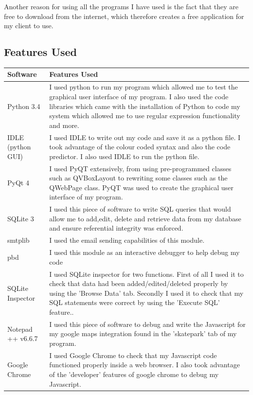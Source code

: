 Another reason for using all the programs I have used is the fact that they are free to download from the internet, which therefore creates a free application for my client to use.

\subsection{Features Used}

\begin{center}
\begin{tabular}{|p{3.5cm}|p{8cm}|} \hline
\textbf{Software} & \textbf{Features Used} \\ \hline
Python 3.4 & I used python to run my program which allowed me to test the graphical user interface of my program. I also used the code libraries which came with the installation of Python to code my system which allowed me to use regular expression functionality and more.\\ \hline
IDLE (python GUI) & I used IDLE to write out my code and save it as a python file. I took advantage of the colour coded syntax and also the code predictor. I also used IDLE to run the python file.\\ \hline
PyQt 4 & I used PyQT extensively, from using pre-programmed classes such as QVBoxLayout to rewriting some classes such as the QWebPage class. PyQT was used to create the graphical user interface of my program.\\ \hline
SQLite 3 & I used this piece of software to write SQL queries that would allow me to add,edit, delete and retrieve data from my database and ensure referential integrity was enforced. \\ \hline
smtplib & I used the email sending capabilities of this module. \\ \hline
pbd & I used this module as an interactive debugger to help debug my code \\ \hline
SQLite Inspector & I used SQLite inspector for two functions. First of all I used it to check that data had been added/edited/deleted properly by using the 'Browse Data' tab. Secondly I used it to check that my SQL statements were correct by using the 'Execute SQL' feature.. \\ \hline
Notepad ++ v6.6.7 & I used this piece of software to debug and write the Javascript for my google maps integration found in the 'skatepark' tab of my program. \\ \hline
Google Chrome & I used Google Chrome to check that my Javascript code functioned properly inside a web browser. I also took advantage of the 'developer' features of google chrome to debug my Javascript.\\ \hline

\end{tabular}
\label{tab:Software Features Used}
\end{center}

